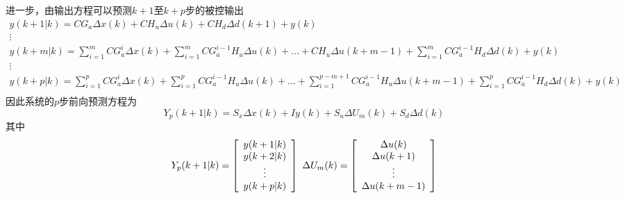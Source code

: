 \documentclass[UTF8]{article}
\begin{document}
进一步，由输出方程可以预测$k+1$至$k+p$步的被控输出
\[
    \begin{array}{c}
        y(k+1|k) = CG_{a}\Delta x(k)+CH_{u} \Delta u(k)+ CH_{d} \Delta d(k+1) + y(k)\\
        \vdots \\ 
        y(k+m|k) = \sum\limits_{i=1}^{m}CG_{a}^i\Delta x(k)+\sum\limits_{i=1}^{m}CG_{a}^{i-1}H_{u}\Delta u(k) + \ldots + CH_{u}\Delta u(k+m-1)+\sum\limits_{i=1}^{m}CG_{a}^{i-1}H_{d} \Delta d(k)+y(k) \\
        \vdots \\ 
        y(k+p|k) = \sum\limits_{i=1}^{p}CG_{a}^i\Delta x(k)+\sum\limits_{i=1}^{p}CG_{a}^{i-1}H_{u}\Delta u(k) + \ldots + \sum\limits_{i=1}^{p-m+1}CG_{a}^{i-1}H_{u}\Delta u(k+m-1)+\sum\limits_{i=1}^{p}CG_{a}^{i-1}H_{d} \Delta d(k)+y(k) \\
    \end{array}
\]
因此系统的$p$步前向预测方程为
\[
    Y_{p}(k+1|k)=S_{x}\Delta x(k)+ Iy(k)+{S}_{u} \Delta U_{m}(k)+ {S}_{d} \Delta d(k)
\]
其中
\[
    Y_{p}(k+1|k)=
    \left[
        \begin{array}{c}
            y(k+1|k) \\ 
            y(k+2|k) \\
            \vdots  \\
            y(k+p|k) \\
        \end{array}
    \right]
    \hbox{  }
    \Delta U_{m}(k)=
    \left[
        \begin{array}{c}
            \Delta u(k) \\ 
            \Delta u(k+1) \\
            \vdots  \\
            \Delta u(k+m-1) \\
        \end{array}
    \right]
\]
\end{document}
